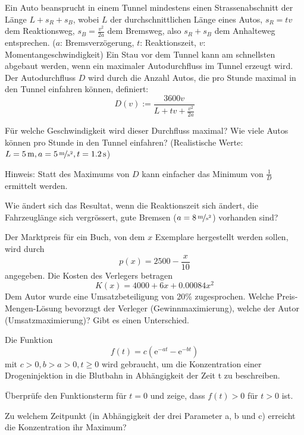 \documentclass[%
11pt,%
twoside,%
titlepage,%
german,%
headsepline%
]{scrartcl}
\begin{document}
\begin{ueb}[Stau]
Ein Auto beansprucht in einem Tunnel mindestens einen Strassenabschnitt der L\"ange $L+s_R+s_B$, wobei $L$ der durchschnittlichen L\"ange eines Autos, $s_R=tv$ dem Reaktionsweg, $s_B=\frac{v^2}{2a}$ dem Bremsweg, also $s_R+s_B$ dem Anhalteweg entsprechen. ($a$: Bremsverz\"ogerung, $t$: Reaktionszeit, $v$: Momentangeschwindigkeit)
Ein Stau vor dem Tunnel kann am schnellsten abgebaut werden, wenn ein maximaler Autodurchfluss im Tunnel erzeugt wird. Der Autodurchfluss $D$ wird durch die Anzahl Autos, die pro Stunde maximal in den Tunnel einfahren k\"onnen, definiert:
$$D(v):=\frac{3600v}{L+tv+\frac{v^2}{2a}}$$
\begin{enumeratea}
\item F\"ur welche Geschwindigkeit wird dieser Durchfluss maximal? Wie viele Autos k\"onnen pro Stunde in den Tunnel einfahren? (Realistische Werte: $L=\unit[5]{m}, a=\unitfrac[5]{m}{s^2}, t=\unit[1.2]{s}$)

{\small Hinweis: Statt des Maximums von $D$ kann einfacher das Minimum von $\frac{1}{D}$ ermittelt werden.}
\item Wie \"andert sich das Resultat, wenn die Reaktionszeit sich \"andert, die Fahrzeugl\"ange sich vergr\"ossert, gute Bremsen ($a=\unitfrac[8]{m}{s^2}$) vorhanden sind?
\end{enumeratea}
\end{ueb}

\begin{ueb}[Marktpreis]
Der Marktpreis f\"ur ein Buch, von dem $x$ Exemplare hergestellt werden sollen, wird durch
$$p(x)=2500-\frac{x}{10}$$
angegeben. Die Kosten des Verlegers betragen
$$K(x)=4000+6x+0.00084x^2$$
Dem Autor wurde eine Umsatzbeteiligung von 20\% zugesprochen. Welche Preis-Mengen-L\"osung bevorzugt der Verleger (Gewinnmaximierung), welche der Autor (Umsatzmaximierung)? Gibt es einen Unterschied.
\end{ueb}

\begin{ueb}[Drogen]
Die
Funktion
$$f(t)=c\left(\mathrm{e}^{-at}-\mathrm{e}^{-bt}\right)$$
mit $c>0, b>a>0, t\geq0$ wird gebraucht, um die Konzentration einer Drogeninjektion in die Blutbahn in Abh\"angigkeit der Zeit t zu beschreiben.
\begin{enumeratea}
\item \"Uberpr\"ufe den Funktionsterm f\"ur $t = 0$ und zeige,
dass $f(t) >0$ f\"ur $t >0$ ist.
\item Zu welchem Zeitpunkt (in Abh\"angigkeit der drei Parameter a, b und c) erreicht die Konzentration ihr Maximum?
\end{enumeratea}
\end{ueb}
\end{document}
